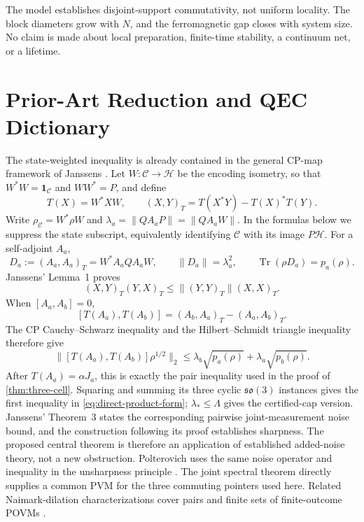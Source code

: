 \documentclass[11pt]{article}
\theoremstyle{remark}
\newcommand{\1}{\mathbf 1}
\newcommand{\Tr}{\operatorname{Tr}}
\begin{document}
The model establishes disjoint-support commutativity, not uniform locality.
The block diameters grow with $N$, and the ferromagnetic gap closes with system
size. No claim is made about local preparation, finite-time stability, a
continuum net, or a lifetime.

\section{Prior-Art Reduction and QEC Dictionary}
\label{sec:related}

The state-weighted inequality is already contained in the general CP-map
framework of Janssens \cite{janssens2017}. Let
$W:\mathcal C\to\mathcal H$ be the encoding isometry, so that
$W^*W=\1_{\mathcal C}$ and $WW^*=P$, and define
\[
  T(X)=W^*XW,
  \qquad
  (X,Y)_T=T(X^*Y)-T(X)^*T(Y).
\]
Write $\rho_{\mathcal C}=W^*\rho W$ and
$\lambda_a=\lVert Q A_aP\rVert=\lVert Q A_aW\rVert$. In the formulas below
we suppress the state subscript, equivalently identifying $\mathcal C$ with
its image $P\mathcal H$.
For a self-adjoint $A_a$,
\begin{equation}
  D_a:=(A_a,A_a)_T=W^*A_aQA_aW,
  \qquad
  \lVert D_a\rVert=\lambda_a^2,
  \qquad
  \Tr(\rho D_a)=p_a(\rho).
  \label{eq:noise-operator}
\end{equation}
Janssens' Lemma~1 proves
\[
  (X,Y)_T(Y,X)_T\leq\lVert(Y,Y)_T\rVert(X,X)_T.
\]
When $[A_a,A_b]=0$,
\[
  [T(A_a),T(A_b)]=(A_b,A_a)_T-(A_a,A_b)_T.
\]
The CP Cauchy--Schwarz inequality and the Hilbert--Schmidt triangle inequality
therefore give
\begin{equation}
  \lVert[T(A_a),T(A_b)]\rho^{1/2}\rVert_2
  \leq\lambda_b\sqrt{p_a(\rho)}
       +\lambda_a\sqrt{p_b(\rho)}.
  \label{eq:janssens-pair}
\end{equation}
After $T(A_a)=\alpha J_a$, this is exactly the pair inequality used in the
proof of \cref{thm:three-cell}. Squaring and summing its three cyclic
$\mathfrak{so}(3)$ instances gives the first inequality in
\cref{eq:direct-product-form}; $\lambda_*\leq\Lambda$ gives the certified-cap
version. Janssens' Theorem~3 states the corresponding pairwise
joint-measurement noise bound, and the construction following its proof
establishes sharpness. The proposed central theorem is therefore an application
of established added-noise theory, not a new obstruction. Polterovich uses the
same noise operator and inequality in the unsharpness principle
\cite{polterovich2014}. The joint spectral theorem directly supplies a common
PVM for the three commuting pointers used here. Related Naimark-dilation
characterizations cover pairs \cite{beneduci2014} and finite sets of
finite-outcome POVMs \cite{mitra2020}.
\end{document}
